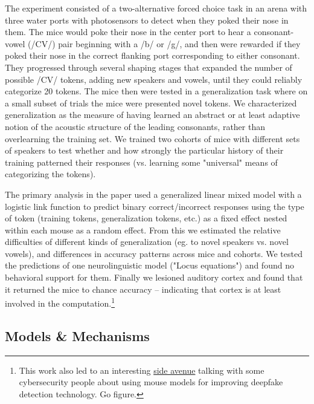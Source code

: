 \begin{done}
The experiment consisted of a two-alternative forced choice task in an arena with three water ports with photosensors to detect when they poked their nose in them. The mice would poke their nose in the center port to hear a consonant-vowel (/CV/) pair beginning with a /b/ or /g/, and then were rewarded if they poked their nose in the correct flanking port corresponding to either consonant. They progressed through several shaping stages that expanded the number of possible /CV/ tokens, adding new speakers and vowels, until they could reliably categorize 20 tokens. The mice then were tested in a generalization task where on a small subset of trials the mice were presented novel tokens. We characterized generalization as the measure of having learned an abstract or at least adaptive notion of the acoustic structure of the leading consonants, rather than overlearning the training set. We trained two cohorts of mice with different sets of speakers to test whether and how strongly the particular history of their training patterned their responses (vs. learning some "universal" means of categorizing the tokens).

The primary analysis in the paper used a generalized linear mixed model with a logistic link function to predict binary correct/incorrect responses using the type of token (training tokens, generalization tokens, etc.) as a fixed effect nested within each mouse as a random effect. From this we estimated the relative difficulties of different kinds of generalization (eg. to novel speakers vs. novel vowels), and differences in accuracy patterns across mice and cohorts. We tested the predictions of one neurolinguistic model ("Locus equations") and found no behavioral support for them. Finally we lesioned auditory cortex and found that it returned the mice to chance accuracy -- indicating that cortex is at least involved in the computation.\footnote{This work also led to an interesting \href{https://www.blackhat.com/us-19/briefings/schedule/\#detecting-deep-fakes-with-mice-14467}{side avenue} talking with some cybersecurity people about using mouse models for improving deepfake detection technology. Go figure.} 
\end{done}

\subsection{Models \& Mechanisms}


